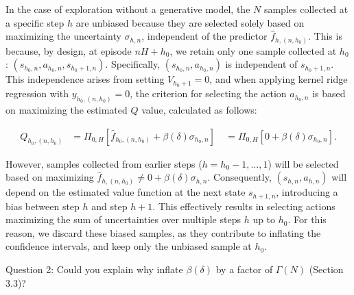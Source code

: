 \documentclass{article}
\begin{document}
In the case of exploration without a generative model, the $N$ samples collected at a specific step $h$ are unbiased because they are selected solely based on maximizing the uncertainty $\sigma_{h,n}$, independent of the predictor $\hat{f}_{h,(n,h_0)}$. This is because, by design, at episode $nH + h_0$, we retain only one sample collected at $h_0$: ${(s_{h_0,n}, a_{h_0,n}, s_{h_0+1,n})}$. Specifically, $(s_{h_0,n}, a_{h_0,n})$ is independent of $s_{h_0+1,n}$. This independence arises from setting $V_{h_0 + 1} = 0$, and when applying kernel ridge regression with $y_{h_0,(n,h_0)} = 0$, the criterion for selecting the action $a_{h_0,n}$ is based on maximizing the estimated $Q$ value, calculated as follows:

\begin{align}
Q_{h_0,(n,h_0)} &= \Pi_{0,H} \left[ \hat{f}_{h_0,(n,h_0)} + \beta(\delta) \sigma_{h_0,n} \right] \
&= \Pi_{0,H} \left[ 0 + \beta(\delta) \sigma_{h_0,n} \right].
\end{align}

However, samples collected from earlier steps ($h = h_0 - 1, \ldots, 1$) will be selected based on maximizing $\hat{f}_{h,(n,h_0)} \neq 0 + \beta(\delta) \sigma_{h,n}$. Consequently, ${(s_{h,n}, a_{h,n})}$ will depend on the estimated value function at the next state $s_{h+1,n}$, introducing a bias between step $h$ and step $h+1$. This effectively results in selecting actions maximizing the sum of uncertainties over multiple steps $h$ up to $h_0$. For this reason, we discard these biased samples, as they contribute to inflating the confidence intervals, and keep only the unbiased sample at $h_0$.

Question 2: Could you explain why \cite{qiu2021reward} inflate $\beta(\delta)$ by a factor of $\Gamma(N)$ (Section 3.3)?
\end{document}
